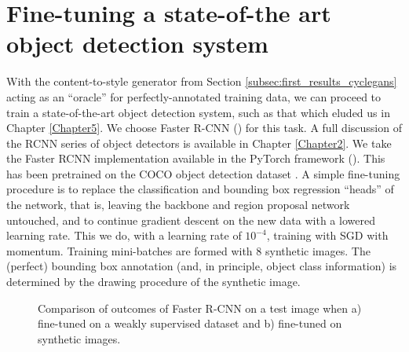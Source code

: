 \section{Fine-tuning a state-of-the art object detection system}
\label{sec:fine_tuning_rcnn}

With the content-to-style generator from Section \ref{subsec:first_results_cyclegans} acting as an ``oracle'' for perfectly-annotated training data, we can proceed to train a state-of-the-art object detection system, such as that which eluded us in Chapter \ref{Chapter5}. We choose Faster R-CNN (\cite{girshick2015fast}) for this task. A full discussion of the RCNN series of object detectors is available in Chapter \ref{Chapter2}. We take the Faster RCNN implementation available in the PyTorch framework (\cite{paszke2017automatic}). This has been pretrained on the COCO object detection dataset \cite{lin2014microsoft}. A simple fine-tuning procedure is to replace the classification and bounding box regression ``heads'' of the network, that is, leaving the backbone and region proposal network untouched, and to continue gradient descent on the new data with a lowered learning rate. This we do, with a learning rate of $10^{-4}$, training with SGD with momentum. Training mini-batches are formed with $8$ synthetic images. The (perfect) bounding box annotation (and, in principle, object class information) is determined by the drawing procedure of the synthetic image.

\begin{figure}[h]%
    \centering
    \qquad
    \caption{Comparison of outcomes of Faster R-CNN on a test image when a) fine-tuned on a weakly supervised dataset and b) fine-tuned on synthetic images.}%
    \label{fig:faster_rcnn}%
\end{figure}

